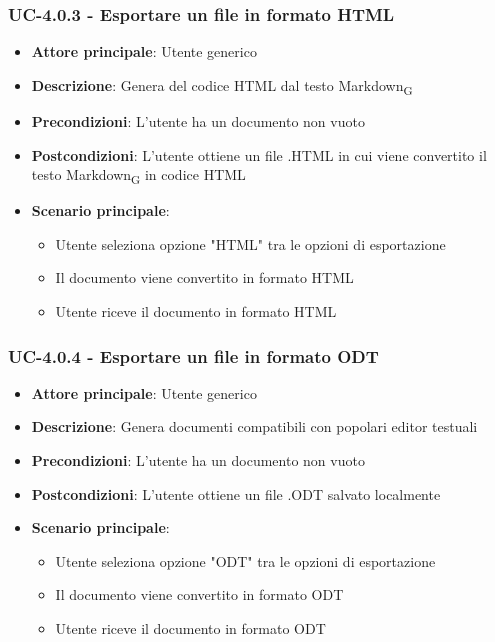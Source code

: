 \documentclass[11pt,a4paper]{article}
\newcommand{\gls}[1]{#1\textsubscript{G}}
\begin{document}
\subsubsection{UC-4.0.3 - Esportare un file in formato HTML}
\begin{itemize}
    \item \textbf{Attore principale}: Utente generico
    \item \textbf{Descrizione}: Genera del codice HTML dal testo \gls{Markdown}
    \item \textbf{Precondizioni}: L'utente ha un documento non vuoto
    \item \textbf{Postcondizioni}: L'utente ottiene un file .HTML in cui viene convertito il testo \gls{Markdown} in codice HTML
    \item \textbf{Scenario principale}:
        \begin{itemize}
            \item Utente seleziona opzione "HTML" tra le opzioni di esportazione
            \item Il documento viene convertito in formato HTML
            \item Utente riceve il documento in formato HTML
        \end{itemize}
\end{itemize}

\subsubsection{UC-4.0.4 - Esportare un file in formato ODT}
\begin{itemize}
    \item \textbf{Attore principale}: Utente generico
    \item \textbf{Descrizione}: Genera documenti compatibili con popolari editor testuali
    \item \textbf{Precondizioni}: L'utente ha un documento non vuoto
    \item \textbf{Postcondizioni}: L'utente ottiene un file .ODT salvato localmente
    \item \textbf{Scenario principale}:
        \begin{itemize}
            \item Utente seleziona opzione "ODT" tra le opzioni di esportazione
            \item Il documento viene convertito in formato ODT
            \item Utente riceve il documento in formato ODT
        \end{itemize}
\end{itemize}
\end{document}
